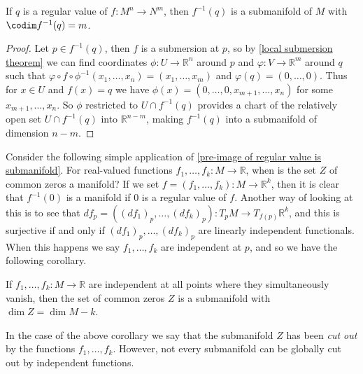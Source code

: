 \begin{cor}
\label{pre-image of regular value is submanifold}
If $q$ is a regular value of $f : M^n \rightarrow N^m$, then $f^{-1}(q)$ is a submanifold of $M$ with $\codim f^{-1}(q) = m$.
\end{cor}
\begin{proof}
Let $p \in f^{-1}(q)$, then $f$ is a submersion at $p$, so by \cref{local submersion theorem} we can find coordinates $\phi : U \rightarrow \mathbb R^n$ around $p$ and $\varphi : V \rightarrow \mathbb R^m$ around $q$ such that $\varphi \circ f \circ \phi^{-1}(x_1,\ldots,x_n)=(x_1,\ldots,x_m)$ and $\varphi(q)=(0,\ldots,0)$. Thus for $x \in U$ and $f(x)=q$ we have $\phi(x)=(0,\ldots,0,x_{m+1},\ldots,x_n)$ for some $x_{m+1},\ldots,x_n$. So $\phi$ restricted to $U \cap f^{-1}(q)$ provides a chart of the relatively open set $U \cap f^{-1}(q)$ into $\mathbb R^{n-m}$, making $f^{-1}(q)$ into a submanifold of dimension $n-m$.
\end{proof}

Consider the following simple application of \cref{pre-image of regular value is submanifold}. For real-valued functions $f_1,\ldots,f_k : M \rightarrow \mathbb R$, when is the set $Z$ of common zeros a manifold? If we set $f = (f_1,\ldots,f_k) : M \rightarrow \mathbb R^k$, then it is clear that $f^{-1}(0)$ is a manifold if $0$ is a regular value of $f$. Another way of looking at this is to see that $df_p = ((df_1)_p,\ldots,(df_k)_p) : T_p M \rightarrow T_{f(p)} \mathbb R^k$, and this is surjective if and only if $(df_1)_p,\ldots,(df_k)_p$ are linearly independent functionals. When this happens we say $f_1,\ldots,f_k$ are independent at $p$, and so we have the following corollary.
\begin{cor}
If $f_1,\ldots,f_k : M \rightarrow \mathbb R$ are independent at all points where they simultaneously vanish, then the set of common zeros $Z$ is a submanifold with $\dim Z = \dim M - k$.
\end{cor}

In the case of the above corollary we say that the submanifold $Z$ has been \emph{cut out} by the functions $f_1,\ldots,f_k$. However, not every submanifold can be globally cut out by independent functions. 


